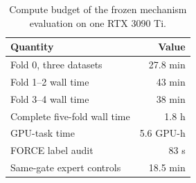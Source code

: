 \begin{table}
\caption{Compute budget of the frozen mechanism evaluation on one RTX 3090 Ti.}
\label{tab:compute}
\centering
\footnotesize
\begin{tabular*}{\textwidth}{@{\extracolsep{\fill}}lr@{}}
\toprule
Quantity & Value \\
\midrule
Fold 0, three datasets & 27.8 min \\
Fold 1--2 wall time & 43 min \\
Fold 3--4 wall time & 38 min \\
Complete five-fold wall time & 1.8 h \\
GPU-task time & 5.6 GPU-h \\
FORCE label audit & 83 s \\
Same-gate expert controls & 18.5 min \\
\bottomrule
\end{tabular*}
\end{table}
